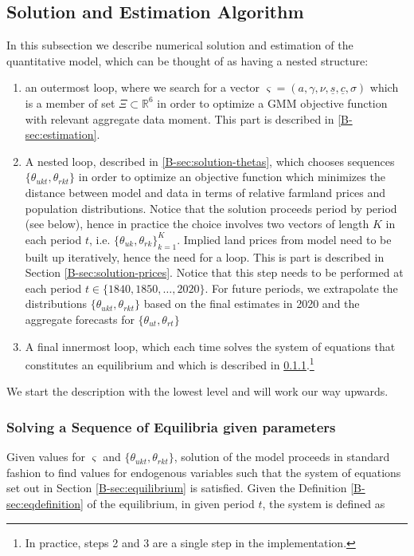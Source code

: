\documentclass[11pt]{report}
\begin{document}
\subsection{Solution and Estimation Algorithm}\label{B-sec:solestimation}

In this subsection we describe numerical solution and estimation of the quantitative model, which can be thought of as having a nested structure: 
\begin{enumerate}
	\item an outermost loop, where we search for a vector $\varsigma = (a,\gamma, \nu,\underline{s},\underline{c}, \sigma)$ which is a member of set $\Xi \subset \mathbb{R}^6$ in order to optimize a GMM objective function with relevant aggregate data moment. This part is described in \ref{B-sec:estimation}. 
	\item A nested loop, described in \ref{B-sec:solution-thetas}, which chooses sequences $\{\theta_{ukt},\theta_{rkt}\}$ in order to optimize an objective function which minimizes the distance between model and data in terms of relative farmland prices and population distributions. Notice that the solution proceeds period by period (see below), hence in practice the choice involves two vectors of length $K$ in each period $t$, i.e. $\{\theta_{uk},\theta_{rk}\}_{k=1}^K$. Implied land prices from model need to be built up iteratively, hence the need for a loop. This is part is described in Section \ref{B-sec:solution-prices}. Notice that this step needs to be performed at each period $t\in\{1840,1850,\dots,2020\}$. For future periods, we extrapolate the distributions $\{\theta_{ukt},\theta_{rkt}\}$ based on the final estimates in 2020 and the aggregate forecasts for $\{\theta_{ut},\theta_{rt}\}$
	\item A final innermost loop, which each time solves the system of equations that constitutes an equilibrium and which is described in \ref{B-sec:solution-innermost}.\footnote{In practice, steps 2 and 3 are a single step in the implementation.}
\end{enumerate}

We start the description with the lowest level and will work our way upwards. 

\subsubsection{Solving a Sequence of Equilibria given parameters}\label{B-sec:solution-innermost}


Given values for $\varsigma$ and $\{\theta_{ukt},\theta_{rkt}\}$, solution of the model proceeds in standard fashion to find values for endogenous variables such that the system of equations set out in Section \ref{B-sec:equilibrium} is satisfied. Given the Definition \eqref{B-sec:eqdefinition} of the equilibrium, in given period $t$, the system is defined as
\end{document}
